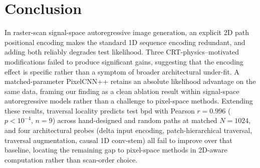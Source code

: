 \documentclass[conference,a4paper]{IEEEtran}
\begin{document}
\section{Conclusion}

In raster-scan signal-space autoregressive image generation, an
explicit 2D path positional encoding makes the standard 1D sequence
encoding redundant, and adding both reliably degrades test
likelihood. Three CRT-physics--motivated modifications failed to
produce significant gains, suggesting that the encoding effect is
specific rather than a symptom of broader architectural under-fit.
A matched-parameter PixelCNN++ retains an absolute likelihood
advantage on the same data, framing our finding as a clean ablation
result within signal-space autoregressive models rather than a
challenge to pixel-space methods.
Extending these results, traversal locality predicts test bpd with
Pearson $r=0.996$ ($p<10^{-4}$, $n{=}9$) across hand-designed and
random paths at matched $N{=}1024$, and four architectural probes
(delta input encoding, patch-hierarchical traversal, traversal
augmentation, causal 1D conv-stem) all fail to improve over that
baseline, locating the remaining gap to pixel-space methods in
2D-aware computation rather than scan-order choice.


\end{document}
